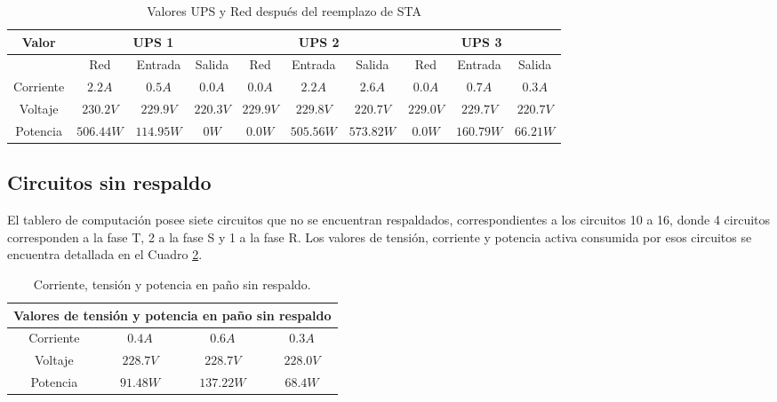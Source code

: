 \documentclass{article}
\begin{document}
\begin{center}
    \begin{table}[H]
        \centering
        \begin{tabular}{c | c c c | c c c | c c c}
            Valor & \multicolumn{3}{c}{UPS 1} & \multicolumn{3}{c}{UPS 2} & \multicolumn{3}{c}{UPS 3}  \\\hline
            & Red & Entrada & Salida & Red & Entrada & Salida & Red & Entrada & Salida \\ 
            Corriente & $2.2 A$ & $0.5 A$ & $0.0 A$ & $0.0 A$ & $2.2 A$ & $2.6 A$ & $0.0 A$ & $0.7 A$ & $0.3 A$\\
            Voltaje & $230.2 V$ & $229.9 V$ & $220.3 V$ & $229.9 V$ & $229.8 V$ & $220.7 V $ & $229.0 V$ & $ 229.7 V$ & $ 220.7 V$ \\ 
            Potencia & $ 506.44 W $ & $114.95 W$ & $0 W$ & $ 0.0 W$ & $505.56 W$ & $573.82 W$ & $0.0 W$ & $160.79 W$ & $66.21 W$ \\
        \end{tabular}
        \caption{Valores UPS y Red después del reemplazo de STA}
        \label{tab:UPs_despues}
    \end{table}
\end{center}




\subsection{Circuitos sin respaldo}
El tablero de computación posee siete circuitos que no se encuentran respaldados, correspondientes a los circuitos 10 a 16, donde 4 circuitos corresponden a la fase T, 2 a la fase S y 1 a la fase R.
Los valores de tensión, corriente y potencia activa consumida por esos circuitos se encuentra detallada en el Cuadro \ref{tab:Pañosinrespaldo}.

\begin{center}
    \begin{table}[H]
        \centering
        \begin{tabular}{c c c c}
             \multicolumn{4}{c}{Valores de tensión y potencia en paño sin respaldo} \\\hline
             Corriente & $0.4 A$ & $0.6 A$ & $0.3 A$\\
             Voltaje & $228.7 V$ & $228.7 V$ & $228.0 V$\\
             Potencia  & $91.48 W$ & $137.22 W$ & $68.4 W$\\
        \end{tabular}
        \caption{Corriente, tensión y potencia en paño sin respaldo.}
        \label{tab:Pañosinrespaldo}
    \end{table}
\end{center}
\end{document}

